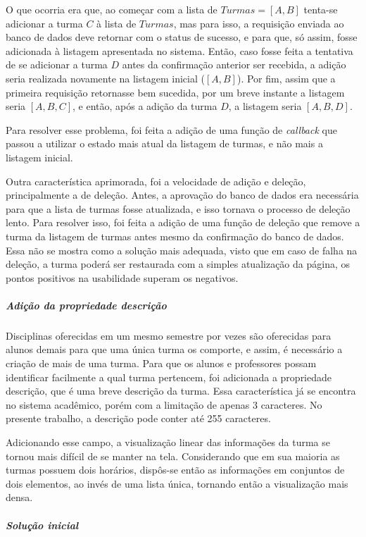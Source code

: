O que ocorria era que, ao começar com a lista de $Turmas = [A, B]$ tenta-se adicionar a turma $C$ à lista de $Turmas$, mas para isso, a requisição enviada ao banco de dados deve retornar com o status de sucesso, e para que, só assim, fosse adicionada à listagem apresentada no sistema. Então, caso fosse feita a tentativa de se adicionar a turma $D$ antes da confirmação anterior ser recebida, a adição seria realizada novamente na listagem inicial ($[A, B]$). Por fim, assim que a primeira requisição retornasse bem sucedida, por um breve instante a listagem seria $[A, B, C]$, e então, após a adição da turma $D$, a listagem seria $[A, B, D]$.

Para resolver esse problema, foi feita a adição de uma função de \textit{callback} que passou a utilizar o estado mais atual da listagem de turmas, e não mais a listagem inicial.

Outra característica aprimorada, foi a velocidade de adição e deleção, principalmente a de deleção. Antes, a aprovação do banco de dados era necessária para que a lista de turmas fosse atualizada, e isso tornava o processo de deleção lento. Para resolver isso, foi feita a adição de uma função de deleção que remove a turma da listagem de turmas antes mesmo da confirmação do banco de dados. Essa não se mostra como a solução mais adequada, visto que em caso de falha na deleção, a turma poderá ser restaurada com a simples atualização da página, os pontos positivos na usabilidade superam os negativos.

\subparagraph*{Adição da propriedade descrição}

Disciplinas oferecidas em um mesmo semestre por vezes são oferecidas para alunos demais para que uma única turma os comporte, e assim, é necessário a criação de mais de uma turma. Para que os alunos e professores possam identificar facilmente a qual turma pertencem, foi adicionada a propriedade descrição, que é uma breve descrição da turma. Essa característica já se encontra no sistema acadêmico, porém com a limitação de apenas 3 caracteres. No presente trabalho, a descrição pode conter até 255 caracteres.

Adicionando esse campo, a visualização linear das informações da turma se tornou mais difícil de se manter na tela. Considerando que em sua maioria as turmas possuem dois horários, dispôs-se então as informações em conjuntos de dois elementos, ao invés de uma lista única, tornando então a visualização mais densa.

\subparagraph*{Solução inicial}

